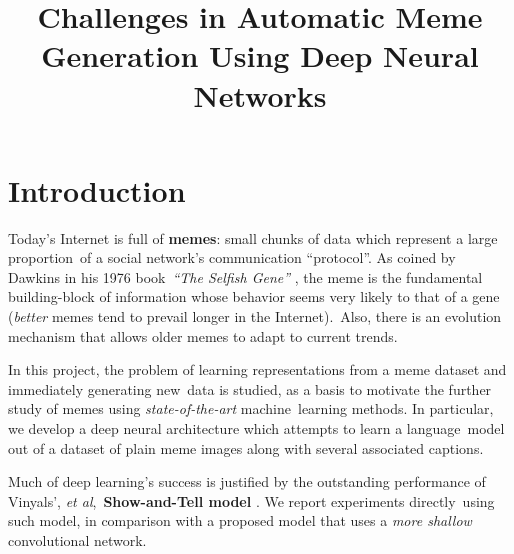 \documentclass[paper=letter, fontsize=11pt]{scrartcl}
\title{
  \normalsize
  Challenges in Automatic Meme Generation Using Deep Neural Networks
}
\date{}
\begin{document}
\maketitle

\section*{Introduction}

\noindent
Today's Internet is full of \textbf{memes}: small chunks of data which represent a large proportion\
of a social network's communication ``protocol''. As coined by Dawkins in his 1976 book\
\emph{``The Selfish Gene''} \cite{dawkins2006}, the meme is the fundamental building-block of information whose behavior seems very likely to that of a gene (\emph{better} memes tend to prevail longer in the Internet).\
Also, there is an evolution mechanism that allows older memes to adapt to current trends.\par
In this project, the problem of learning representations from a meme dataset and immediately generating new\
data is studied, as a basis to motivate the further study of memes using \emph{state-of-the-art} machine\
learning methods. In particular, we develop a deep neural architecture which attempts to learn a language\
model out of a dataset of plain meme images along with several associated captions.\par
Much of deep learning's success is justified by the outstanding performance of Vinyals', \textit{et al},\
\textbf{Show-and-Tell model} \cite{DBLP:journals/corr/VinyalsTBE14}. We report experiments directly\
using such model, in comparison with a proposed model that uses a \emph{more shallow} convolutional network.
\end{document}
